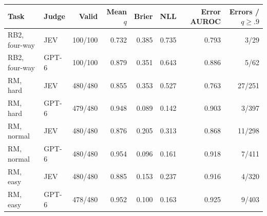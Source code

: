 \begin{tabular}{@{}llrrrrrr@{}}
\toprule
Task & Judge & Valid & Mean $q$ & Brier & NLL & Error AUROC & Errors / $q\geq .9$ \\
\midrule
RB2, four-way & JEV & 100/100 & 0.732 & 0.385 & 0.735 & 0.793 & 3/29 \\
RB2, four-way & GPT-6 & 100/100 & 0.879 & 0.351 & 0.643 & 0.886 & 5/62 \\
RM, hard & JEV & 480/480 & 0.855 & 0.353 & 0.527 & 0.763 & 27/251 \\
RM, hard & GPT-6 & 479/480 & 0.948 & 0.089 & 0.142 & 0.903 & 3/397 \\
RM, normal & JEV & 480/480 & 0.876 & 0.205 & 0.313 & 0.868 & 11/298 \\
RM, normal & GPT-6 & 480/480 & 0.954 & 0.096 & 0.161 & 0.918 & 7/411 \\
RM, easy & JEV & 480/480 & 0.885 & 0.153 & 0.237 & 0.916 & 4/320 \\
RM, easy & GPT-6 & 478/480 & 0.952 & 0.100 & 0.163 & 0.925 & 9/403 \\
\bottomrule
\end{tabular}

